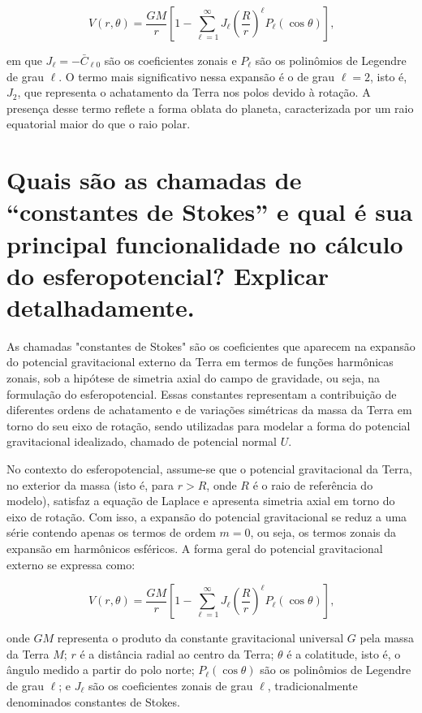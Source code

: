 \[
V(r, \theta) = \frac{GM}{r} \left[1 - \sum_{\ell=1}^{\infty} J_\ell \left( \frac{R}{r} \right)^\ell P_\ell(\cos \theta) \right] \text{,}
\]

\noindent
em que \( J_\ell = -\bar{C}_{\ell 0} \) são os coeficientes zonais e \( P_\ell \) são os polinômios de Legendre de grau \( \ell \). O termo mais significativo nessa expansão é o de grau \( \ell = 2 \), isto é, \( J_2 \), que representa o achatamento da Terra nos polos devido à rotação. A presença desse termo reflete a forma oblata do planeta, caracterizada por um raio equatorial maior do que o raio polar.


\section{Quais são as chamadas de “constantes de Stokes” e qual é sua principal funcionalidade no cálculo do esferopotencial? Explicar detalhadamente.}

As chamadas "constantes de Stokes" são os coeficientes que aparecem na expansão do potencial gravitacional externo da Terra em termos de funções harmônicas zonais, sob a hipótese de simetria axial do campo de gravidade, ou seja, na formulação do esferopotencial. Essas constantes representam a contribuição de diferentes ordens de achatamento e de variações simétricas da massa da Terra em torno do seu eixo de rotação, sendo utilizadas para modelar a forma do potencial gravitacional idealizado, chamado de potencial normal \( U \).

No contexto do esferopotencial, assume-se que o potencial gravitacional da Terra, no exterior da massa (isto é, para \( r > R \), onde \( R \) é o raio de referência do modelo), satisfaz a equação de Laplace e apresenta simetria axial em torno do eixo de rotação. Com isso, a expansão do potencial gravitacional se reduz a uma série contendo apenas os termos de ordem \( m = 0 \), ou seja, os termos zonais da expansão em harmônicos esféricos. A forma geral do potencial gravitacional externo se expressa como:

\[
V(r, \theta) = \frac{GM}{r} \left[ 1 - \sum_{\ell=1}^\infty J_\ell \left( \frac{R}{r} \right)^\ell P_\ell(\cos \theta) \right] \text{,}
\]

\noindent
onde \( GM \) representa o produto da constante gravitacional universal \( G \) pela massa da Terra \( M \); \( r \) é a distância radial ao centro da Terra; \( \theta \) é a colatitude, isto é, o ângulo medido a partir do polo norte; \( P_\ell(\cos \theta) \) são os polinômios de Legendre de grau \( \ell \); e \( J_\ell \) são os coeficientes zonais de grau \( \ell \), tradicionalmente denominados constantes de Stokes.

